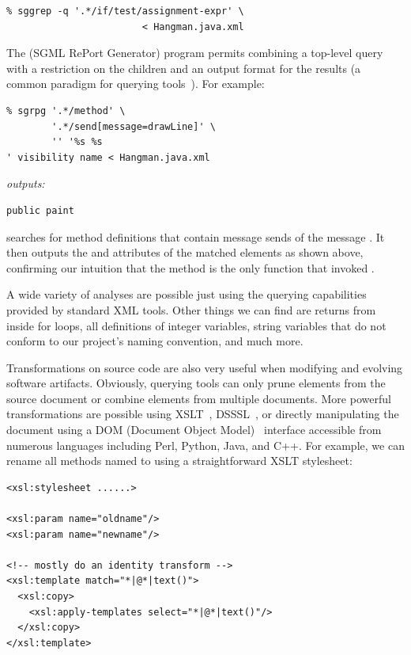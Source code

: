 \documentclass{article}
\begin{document}
\begin{multicols}{2}
{\small
\begin{verbatim}
% sggrep -q '.*/if/test/assignment-expr' \
                        < Hangman.java.xml
\end{verbatim}
}

The  (SGML RePort Generator) program permits combining a
top-level query with a restriction on the children and an output format
for the results (a common paradigm for querying tools~\cite{XMLQL-EnE}).
For example:

{\small
\begin{verbatim}
% sgrpg '.*/method' \
        '.*/send[message=drawLine]' \
        '' '%s %s 
' visibility name < Hangman.java.xml
\end{verbatim}

\noindent\emph{outputs:}
\begin{verbatim}
public paint
\end{verbatim}
}

\noindent searches for method definitions that contain message sends of the
message \smtexttt{drawLine}.  It then outputs the
 and  attributes of the matched
elements as shown above, confirming our intuition that the
 method is the only function that invoked .

A wide variety of analyses are possible just using the querying
capabilities provided by standard XML tools.  Other things we can find
are returns from inside for loops, all definitions of integer variables,
string variables that do not conform to our project's naming convention,
and much more.

Transformations on source code are also very useful when modifying and
evolving software artifacts.  Obviously, querying tools can only prune
elements from the source document or combine elements from multiple
documents.  More powerful transformations are possible using
XSLT~\cite{XSLT}, DSSSL~\cite{DSSSL}, or directly manipulating the
document using a DOM (Document Object Model)~\cite{DOM} interface
accessible from numerous languages including Perl, Python, Java, and
C++.  For example, we can rename all methods named \smtexttt{isBall} to
\smtexttt{FIsBall} using a straightforward XSLT stylesheet:

{ \small
\begin{verbatim}
<xsl:stylesheet ......>

<xsl:param name="oldname"/>
<xsl:param name="newname"/>

<!-- mostly do an identity transform -->
<xsl:template match="*|@*|text()">
  <xsl:copy>
    <xsl:apply-templates select="*|@*|text()"/>
  </xsl:copy>
</xsl:template>


\end{verbatim}}
\end{multicols}
\end{document}
